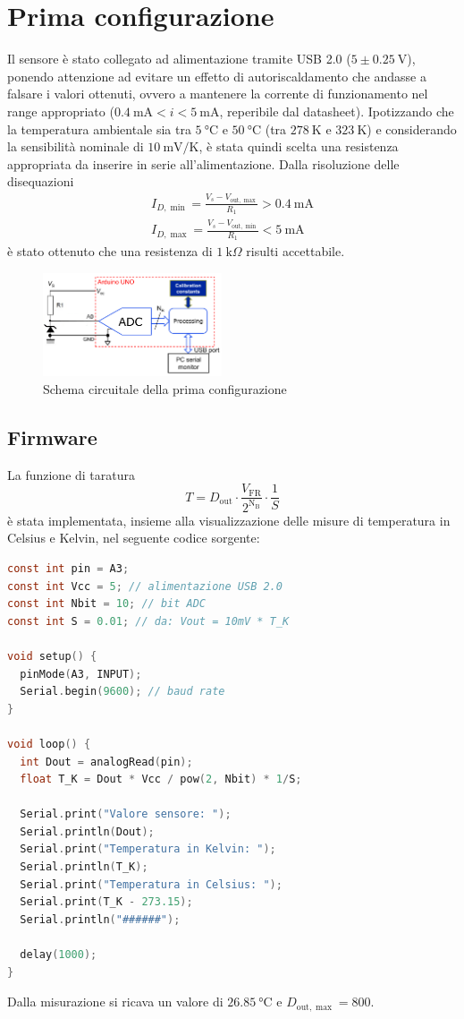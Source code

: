 \documentclass{article}
\begin{document}
\section{Prima configurazione}
Il sensore è stato collegato ad alimentazione tramite USB 2.0 ($5 \pm \SI{0.25}{\volt}$), ponendo attenzione ad evitare un effetto di autoriscaldamento che andasse a falsare i valori ottenuti, ovvero a mantenere la corrente di funzionamento nel range appropriato ($\SI{0.4}{\milli\ampere}<i<\SI{5}{\milli\ampere}$, reperibile dal datasheet). 
Ipotizzando che la temperatura ambientale sia tra $\SI{5}{\celsius}$ e $\SI{50}{\celsius}$ (tra $\SI{278}{\kelvin}$ e $\SI{323}{\kelvin}$) e considerando la sensibilità nominale di $\SI{10}{\milli\volt\per\kelvin}$, è stata quindi scelta una resistenza appropriata da inserire in serie all'alimentazione. Dalla risoluzione delle disequazioni
\begin{align*}
    I_{D,\min}=\frac{V_s-V_{\text{out}, \max}}{R_1} > \SI{0.4}{\milli\ampere}\\
    I_{D,\max}=\frac{V_s-V_{\text{out}, \min}}{R_1} < \SI{5}{\milli\ampere}
\end{align*}
è stato ottenuto che una resistenza di $\SI{1}{\kilo\Omega}$ risulti accettabile.
\begin{figure}[H]
    \centering\includegraphics[width=200px]{img/circuito_1.png}
    \caption{Schema circuitale della prima configurazione}
\end{figure}

\subsection{Firmware}
La funzione di taratura
\begin{equation*}
    T=D_{\text{out}}\cdot\frac{V_{\text{FR}}}{2^{\text{N}_\text{B}}}\cdot\frac{1}{S}
\end{equation*}
è stata implementata, insieme alla visualizzazione delle misure di temperatura in Celsius e Kelvin, nel seguente codice sorgente:
\begin{lstlisting}[language=C]
const int pin = A3;
const int Vcc = 5; // alimentazione USB 2.0
const int Nbit = 10; // bit ADC
const int S = 0.01; // da: Vout = 10mV * T_K

void setup() {
  pinMode(A3, INPUT);
  Serial.begin(9600); // baud rate
}

void loop() {
  int Dout = analogRead(pin); 
  float T_K = Dout * Vcc / pow(2, Nbit) * 1/S; 

  Serial.print("Valore sensore: ");
  Serial.println(Dout);
  Serial.print("Temperatura in Kelvin: ");
  Serial.println(T_K);
  Serial.print("Temperatura in Celsius: ");
  Serial.print(T_K - 273.15);
  Serial.println("######");

  delay(1000);
}
\end{lstlisting}
Dalla misurazione si ricava un valore di $\SI{26.85}{\celsius}$ e $D_{\text{out}, \max}=800$.
\end{document}
